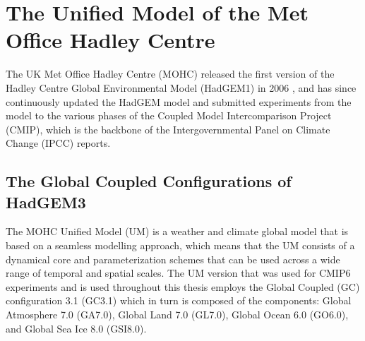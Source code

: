 
\section{The Unified Model of the Met Office Hadley Centre}\label{sq:modeldata}

The UK Met Office Hadley Centre (MOHC) released the first version of the Hadley Centre Global Environmental Model (HadGEM1) in 2006 \citep{johns2006}, and has since continuously updated the HadGEM model and submitted experiments from the model to the various phases of the Coupled Model Intercomparison Project (CMIP), which is the backbone of the Intergovernmental Panel on Climate Change (IPCC) reports. 



\subsection{The Global Coupled Configurations of HadGEM3}

The MOHC Unified Model (UM) is a weather and climate global model that is based on a seamless modelling approach, which means that the UM consists of a dynamical core and parameterization schemes that can be used across a wide range of temporal and spatial scales. 
The UM version that was used for CMIP6 experiments and is used throughout this thesis employs the Global Coupled (GC) configuration 3.1 (GC3.1) \citep{williams2018,walters2019} which in turn is composed of the components: Global Atmosphere 7.0 (GA7.0), Global Land 7.0
(GL7.0), Global Ocean 6.0 (GO6.0), and Global Sea Ice 8.0 (GSI8.0).

